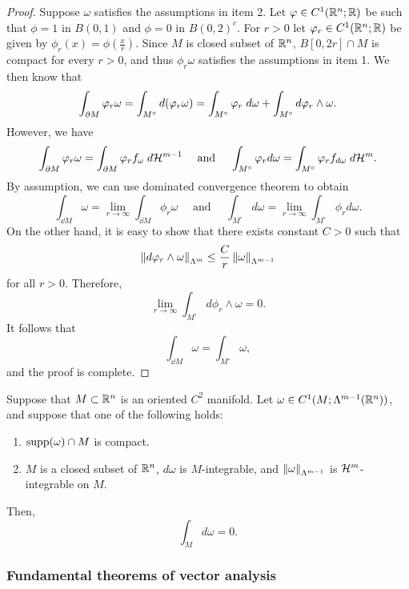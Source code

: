 \documentclass[a4paper]{article}
\begin{document}
\begin{proof}
Suppose $\omega$ satisfies the assumptions in item 2.
Let $\varphi \in C^1 (\mathbb{R}^n ; \mathbb{R})$ be such that $\phi = 1$
in $B(0,1)$ and $\phi = 0$ in $B(0, 2)^c$. For $r > 0$
let $\varphi_r \in C^1 (\mathbb{R}^n ; \mathbb{R})$ be given by
$\phi_r (x) = \phi(\frac{x}{r})$. Since $M$ is closed subset
of $\mathbb{R}^n$, $B[0, 2r] \cap M$ is compact for every $r > 0$,
and thus $\phi_r \omega$ satisfies the assumptions in item 1.
We then know that
\[
\int_{\partial M} \varphi_r \omega
= \int_{M^\circ} d (\varphi_r \omega)
= \int_{M^\circ} \varphi_r \; d \omega + \int_{M^\circ} d \varphi_r
\wedge \omega.
\]
However, we have
\[
\int_{\partial M} \varphi_r \omega = \int_{\partial M} \varphi_r
f_\omega \; d \mathcal{H}^{m-1}
\quad \text{ and } \quad
\int_{M^\circ} \varphi_r d \omega
= \int_{M^\circ} \varphi_r f_{d \omega} \; d \mathcal{H}^m.
\]
By assumption, we can use dominated convergence theorem
to obtain
\[
\int_{\dd M} \omega = \lim_{r \to \infty}
\int_{\dd M} \phi_r \omega
\quad \text{ and } \quad
\int_{M^\circ} d \omega
= \lim_{r \to \infty} \int_{M^\circ} \phi_r d \omega.
\]
On the other hand, it is easy to show that there exists
constant $C > 0$ such that
\[
\left\lVert d \varphi_r \wedge \omega\right\rVert_{\Lambda^m}
\leq \frac{C}{r} \left\lVert \omega\right\rVert_{\Lambda^{m-1}}
\]
for all $r > 0$. Therefore,
\[
\lim_{r \to \infty} \int_{M^\circ} d \phi_r \wedge \omega
= 0.
\]
It follows that
\[
\int_{\dd M} \omega = \int_{M^\circ} \omega,
\]
and the proof is complete.
\end{proof}

\begin{thm}
Suppose that $M \subset \mathbb{R}^n$ is an oriented $C^2$ manifold.
Let $\omega
\in C^1 (M; \Lambda^{m-1} (\mathbb{R}^n))$, and suppose that one of
the following holds:
\begin{enumerate}
  \item $\operatorname{supp} (\omega) \cap M$ is compact.
  \item $M$ is a closed subset of $\mathbb{R}^n$,
  $d \omega$ is $M$-integrable,
  and $\left\lVert \omega\right\rVert_{\Lambda^{m-1}}$ is $\mathcal{H}^m$-integrable
  on $M$.
\end{enumerate}
Then,
\[
\int_M d \omega = 0.
\]
\end{thm}

\subsubsection{Fundamental theorems of vector analysis}
\end{document}
